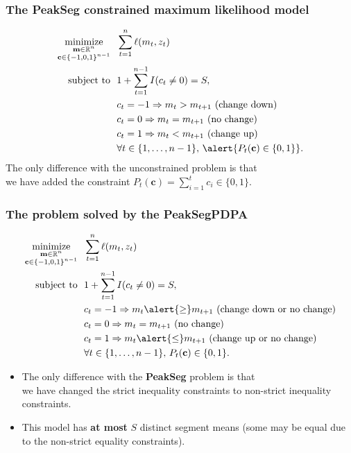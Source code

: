 \documentclass{beamer}
\DeclareMathOperator*{\minimize}{minimize}
\newcommand{\RR}{\mathbb R}
\begin{document}
\begin{frame}
  \frametitle{The PeakSeg constrained maximum likelihood model}
\begin{align*}
    \minimize_{\substack{
  \mathbf m\in\RR^{n}
\\
  \mathbf c\in\{-1,0,1\}^{n-1}
  }} &\ \ 
    \sum_{t=1}^n \ell( m_t,  z_t) \\
    \text{subject to} &\ \  1+\sum_{t=1}^{n-1} I(c_t \neq 0) = S, \\
& \ \ c_t = -1 \Rightarrow m_{t} > m_{t+1} \text{ (change down)}\\
& \ \ c_t = 0 \Rightarrow m_{t} = m_{t+1}  \text{ (no change)}\\
& \ \ c_t = 1 \Rightarrow m_{t} < m_{t+1} \text{ (change up)}\\
&\ \ \forall t\in\{1, \dots, n-1\},\, \alert{P_t(\mathbf c) \in\{0, 1\}}.
\end{align*}
The only difference with the unconstrained problem is that\\
\alert{we
have added the constraint $P_t(\mathbf c)=\sum_{i=1}^t c_i \in\{0, 1\}$}.
\end{frame}

\begin{frame}
  \frametitle{The problem solved by the PeakSegPDPA}
\begin{align*}
    \minimize_{\substack{
  \mathbf m\in\RR^{n}
\\
  \mathbf c\in\{-1,0,1\}^{n-1}
  }} &\ \ 
    \sum_{t=1}^n \ell( m_t,  z_t) 
  \label{PeakSegPDPA}
\\
    \text{subject to} &\ \  1+ \sum_{t=1}^{n-1} I(c_t \neq 0) = S, 
\nonumber\\
& \ \ c_t = -1 \Rightarrow m_{t} \alert{\geq} m_{t+1} \text{ (change down or no change)}
\nonumber\\
& \ \ c_t = 0 \Rightarrow m_{t} = m_{t+1}  \text{ (no change)}
\nonumber\\
& \ \ c_t = 1 \Rightarrow m_{t} \alert{\leq} m_{t+1} \text{ (change up or no change)}
\nonumber\\
&\ \ \forall t\in\{1, \dots, n-1\},\, P_t(\mathbf c) \in\{0, 1\}.
\nonumber
\end{align*}
\begin{itemize}
\item The only difference with the \textbf{PeakSeg} problem is that\\
  \alert{we have changed the strict inequality constraints to non-strict inequality
constraints}. 
\item This model has \textbf{at most} $S$ distinct
  segment means (some may be equal due to the non-strict equality
  constraints).
\end{itemize}
\end{frame}
\end{document}
